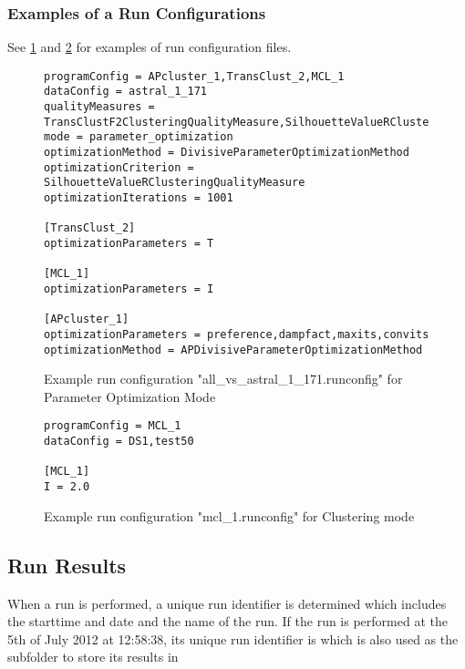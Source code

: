 			\subsubsection{Examples of a Run Configurations}
			
			See \ref{fig:runconfig1} and \ref{fig:runconfig2} for examples of run configuration files.
			
			\begin{figure}[hbtp]
			\label{fig:runconfig1}
			\caption{Example run configuration "all\_vs\_astral\_1\_171.runconfig" for Parameter Optimization Mode}
			\begin{lstlisting}
programConfig = APcluster_1,TransClust_2,MCL_1
dataConfig = astral_1_171
qualityMeasures = TransClustF2ClusteringQualityMeasure,SilhouetteValueRClusteringQualityMeasure
mode = parameter_optimization
optimizationMethod = DivisiveParameterOptimizationMethod
optimizationCriterion = SilhouetteValueRClusteringQualityMeasure
optimizationIterations = 1001

[TransClust_2]
optimizationParameters = T

[MCL_1]
optimizationParameters = I

[APcluster_1]
optimizationParameters = preference,dampfact,maxits,convits
optimizationMethod = APDivisiveParameterOptimizationMethod\end{lstlisting}
			\end{figure}
			
			\begin{figure}[hbtp]
			\label{fig:runconfig2}
			\caption{Example run configuration "mcl\_1.runconfig" for Clustering mode}
			\begin{lstlisting}
programConfig = MCL_1
dataConfig = DS1,test50

[MCL_1]
I = 2.0			\end{lstlisting}
			\end{figure}
			
	\subsection{Run Results}\label{runresults}

	When a run is performed, a unique run identifier is determined which includes the starttime and date and the name of the run. If the run  is performed at the 5th of July 2012 at 12:58:38, its unique run identifier is  which is also used as the subfolder to store its results in
	
